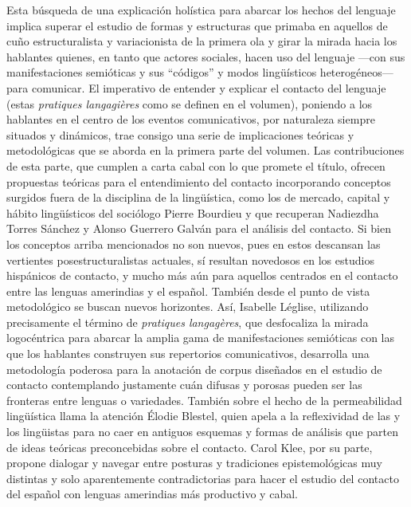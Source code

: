 \documentclass[output=paper]{langscibook}
\begin{document}
Esta búsqueda de una explicación holística para abarcar los hechos del lenguaje implica superar el estudio de formas y estructuras que primaba en aquellos de cuño estructuralista y variacionista de la primera ola y girar la mirada hacia los hablantes quienes, en tanto que actores sociales, hacen uso del lenguaje —con sus manifestaciones semióticas y sus “códigos” y modos lingüísticos heterogéneos— para comunicar. El imperativo de entender y explicar el contacto del lenguaje (estas \textit{pratiques langagières} como se definen en el volumen), poniendo a los hablantes en el centro de los eventos comunicativos, por naturaleza siempre situados y dinámicos, trae consigo una serie de implicaciones teóricas y metodológicas que se aborda en la primera parte del volumen.  Las contribuciones de esta parte, que cumplen a carta cabal con lo que promete el título, ofrecen propuestas teóricas para el entendimiento del contacto incorporando conceptos surgidos fuera de la disciplina de la lingüística, como los de mercado, capital y hábito lingüísticos del sociólogo Pierre Bourdieu y que recuperan Nadiezdha Torres Sánchez y Alonso Guerrero Galván para el análisis del contacto. Si bien los conceptos arriba mencionados no son nuevos, pues en estos descansan las vertientes posestructuralistas actuales, sí resultan novedosos en los estudios hispánicos de contacto, y mucho más aún para aquellos centrados en el contacto entre las lenguas amerindias y el español.  También desde el punto de vista metodológico se buscan nuevos horizontes. Así, Isabelle Léglise, utilizando precisamente el término de \textit{pratiques langagères}, que desfocaliza la mirada logocéntrica para abarcar la amplia gama de manifestaciones semióticas con las que los hablantes construyen sus repertorios comunicativos, desarrolla una metodología poderosa para la anotación de corpus diseñados en el estudio de contacto contemplando justamente cuán difusas y porosas pueden ser las fronteras entre lenguas o variedades. También sobre el hecho de la permeabilidad lingüística llama la atención Élodie Blestel, quien apela a la reflexividad de las y los lingüistas para no caer en antiguos esquemas y formas de análisis que parten de ideas teóricas preconcebidas sobre el contacto. Carol Klee, por su parte, propone dialogar y navegar entre posturas y tradiciones epistemológicas muy distintas y solo aparentemente contradictorias para hacer el estudio del contacto del español con lenguas amerindias más productivo y cabal. 
\end{document}
